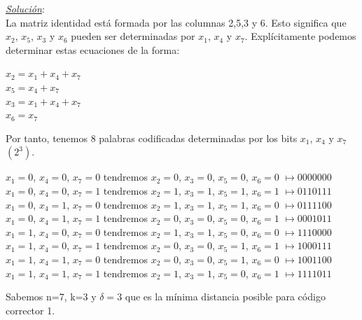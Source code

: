 \documentclass{beamer}
\theoremstyle{plain}
\theoremstyle{example}
\theoremstyle{example}
\begin{document}
\begin{frame}  \tiny
\textit{\underline{Solución}}:\\

La matriz identidad está formada por las columnas 2,5,3  y 6. Esto significa que $x_2$, $x_5$, $x_3$ y $x_6$ pueden ser determinadas por $x_1$, $x_4$ y $x_7$. Explícitamente podemos determinar estas ecuaciones de la forma:

\begin{center}
$x_2=x_1+x_4+x_7$\\
$x_5= x_4 + x_7$\\
$x_3=x_1 + x_4 + x_7$\\
$x_6 = x_7$\\
\end{center}

Por tanto, tenemos 8 palabras codificadas determinadas por los bits $x_1$, $x_4$ y $x_7$ $(2^3)$.\\

\begin{center}
$x_1= 0$, $x_4= 0$, $x_7=0$ tendremos $x_2=0$, $x_3=0$, $x_5=0$, $x_6=0$ $\mapsto 0000000$\\
$x_1= 0$, $x_4= 0$, $x_7=1$ tendremos $x_2=1$, $x_3=1$, $x_5=1$, $x_6=1$ $\mapsto 0110111$\\
$x_1= 0$, $x_4= 1$, $x_7=0$ tendremos $x_2=1$, $x_3=1$, $x_5=1$, $x_6=0$ $\mapsto 0111100$\\
$x_1= 0$, $x_4= 1$, $x_7=1$ tendremos $x_2=0$, $x_3=0$, $x_5=0$, $x_6=1$ $\mapsto 0001011$\\

$x_1= 1$, $x_4= 0$, $x_7=0$ tendremos $x_2=1$, $x_3=1$, $x_5=0$, $x_6=0$ $\mapsto 1110000$\\
$x_1= 1$, $x_4= 0$, $x_7=1$ tendremos $x_2=0$, $x_3=0$, $x_5=1$, $x_6=1$ $\mapsto 1000111$\\
$x_1= 1$, $x_4= 1$, $x_7=0$ tendremos $x_2=0$, $x_3=0$, $x_5=1$, $x_6=0$ $\mapsto 1001100$\\
$x_1= 1$, $x_4= 1$, $x_7=1$ tendremos $x_2=1$, $x_3=1$, $x_5=0$, $x_6=1$ $\mapsto 1111011$\\
\end{center}

Sabemos n=7, k=3 y $\delta=3$ que es la mínima distancia posible para código corrector 1.

 \end{frame} 
\end{document}
